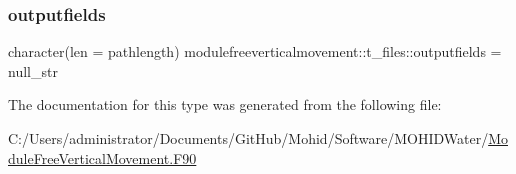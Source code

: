\mbox{\label{structmodulefreeverticalmovement_1_1t__files_a2bf37638654cc5997c92088415f2da2d}} 
\subsubsection{\texorpdfstring{outputfields}{outputfields}}
{\footnotesize\ttfamily character(len = pathlength) modulefreeverticalmovement\+::t\+\_\+files\+::outputfields = null\+\_\+str\hspace{0.3cm}{\ttfamily [private]}}



The documentation for this type was generated from the following file\+:\begin{DoxyCompactItemize}
\item 
C\+:/\+Users/administrator/\+Documents/\+Git\+Hub/\+Mohid/\+Software/\+M\+O\+H\+I\+D\+Water/\mbox{\hyperlink{_module_free_vertical_movement_8_f90}{Module\+Free\+Vertical\+Movement.\+F90}}\end{DoxyCompactItemize}
